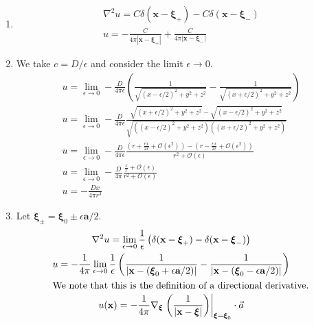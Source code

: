 {\begin{Solution}
  \begin{enumerate} 
  \item 
    \begin{gather*} 
      \nabla^2 u = C \delta(\mathbf{x}-\boldsymbol{\xi}_+) -  C \delta(\mathbf{x}-\boldsymbol{\xi}_-)
      \\
      u = - \frac{C}{4 \pi |\mathbf{x}-\boldsymbol{\xi}_+|}
      + \frac{C}{4 \pi |\mathbf{x}-\boldsymbol{\xi}_-|}
    \end{gather*}
  \item 
    We take $c = D / \epsilon$ and consider the limit $\epsilon \to 0$.
    \begin{gather*} 
      u = \lim_{\epsilon \to 0} - \frac{D}{4 \pi \epsilon} \left( \frac{1}{\sqrt{(x - \epsilon/2)^2 + y^2 + z^2}}
        - \frac{1}{\sqrt{(x + \epsilon/2)^2 + y^2 + z^2}} \right)
      \\
      u = \lim_{\epsilon \to 0} - \frac{D}{4 \pi \epsilon} 
      \frac{\sqrt{(x + \epsilon/2)^2 + y^2 + z^2} - \sqrt{(x - \epsilon/2)^2 + y^2 + z^2}}
      {\sqrt{((x - \epsilon/2)^2 + y^2 + z^2)((x + \epsilon/2)^2 + y^2 + z^2)}}
      \\
      u = \lim_{\epsilon \to 0} - \frac{D}{4 \pi \epsilon} 
      \frac{ \left( r + \frac{\epsilon x}{2 r} + \mathcal{O}(\epsilon^2) \right)
        - \left( r - \frac{\epsilon x}{2 r} + \mathcal{O}(\epsilon^2) \right) }
      { r^2 + \mathcal{O}(\epsilon) }
      \\
      u = \lim_{\epsilon \to 0} - \frac{D}{4 \pi} 
      \frac{ \frac{x}{r} + \mathcal{O}(\epsilon) }
      { r^2 + \mathcal{O}(\epsilon) }
      \\
      u = - \frac{D x}{4 \pi r^3}
    \end{gather*}
  \item  
    Let $\boldsymbol{\xi}_\pm = \boldsymbol{\xi}_0 \pm \epsilon \mathbf{a} / 2$.
    \begin{gather*} 
      \nabla^2 u = \lim_{\epsilon \to 0} \frac{1}{\epsilon} \left( \delta(\mathbf{x}-\boldsymbol{\xi}_+) 
        - \delta(\mathbf{x}-\boldsymbol{\xi}_-) \right)
      \\
      u = - \frac{1}{4 \pi} \lim_{\epsilon \to 0} \frac{1}{\epsilon} \left(
        \frac{1}{|\mathbf{x}-(\boldsymbol{\xi}_0 + \epsilon \mathbf{a} / 2)|}
        - \frac{1}{|\mathbf{x}-(\boldsymbol{\xi}_0 - \epsilon \mathbf{a} / 2)|} \right)
      \\
      \intertext{We note that this is the definition of a directional 
        derivative.}
      u(\mathbf{x}) = - \frac{1}{4 \pi} \nabla_{\boldsymbol{\xi}} \left. 
        \left( \frac{1}{|\mathbf{x} - \boldsymbol{\xi}|} \right) 
      \right|_{\boldsymbol{\xi}=\boldsymbol{\xi}_0} \cdot \vec{a}
    \end{gather*}
  \end{enumerate}
\end{Solution}







}
